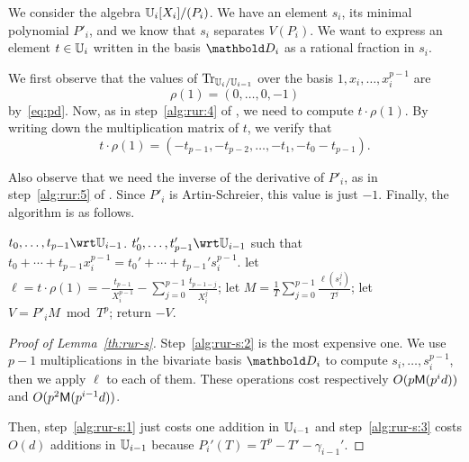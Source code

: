 We consider the algebra $\mathbb{U}_i[X_i]/(P_i)$. We have an element $s_i$,
its minimal polynomial $P'_i$, and we know that $s_i$ separates
$V(P_i)$. We want to express an element $t\in\mathbb{U}_i$ written in the
basis $\basis{D}_i$ as a rational fraction in $s_i$.

We first observe that the values of $\operatorname{Tr}_{\mathbb{U}_i/\mathbb{U}_{i-1}}$ over the
basis $1,x_i,\ldots,x_i^{p-1}$ are 
\begin{equation}
  \label{eq:110}
  \rho(1) = (0,\ldots,0,-1)
\end{equation}
by~\eqref{eq:pd}. Now, as in step~\ref{alg:rur:4} of
, we need to compute $t\cdot\rho(1)$. By
writing down the multiplication matrix of $t$, we verify that
\begin{equation}
  \label{eq:111}
  t\cdot\rho(1) = (-t_{p-1}, -t_{p-2}, \ldots, -t_1, -t_0-t_{p-1})
  \text{.}
\end{equation}

Also observe that we need the inverse of the derivative of $P'_i$, as
in step~\ref{alg:rur:5} of . Since $P'_i$ is Artin-Schreier,
this value is just $-1$. Finally, the algorithm
 is as follows.

\begin{algorithm}
  \caption{$_{\lst{s}_i}$}
  \label{alg:RUR-si}
  \begin{algorithmic}[1]
    \REQUIRE $t_0,\ldots,t_{p-1}\wrt\U_{i-1}$.
    \ENSURE $t_0',\ldots,t_{p-1}'\wrt\U_{i-1}$ such that $t_0+\cdots+t_{p-1}x_i^{p-1}=t_0'+\cdots+t_{p-1}'s_i^{p-1}$.
    \STATE \label{alg:rur-s:1}let $\ell = t\cdot\rho(1) =  -\frac{t_{p-1}}{X_i^{p-1}} - \sum_{j=0}^{p-1} \frac{t_{p-1-j}}{X_i^j}$;
    \STATE \label{alg:rur-s:2}let $M = \frac{1}{T}\sum_{j=0}^{p-1}\frac{\ell(s_i^j)}{T^j}$;
    \STATE \label{alg:rur-s:3}let $V = P'_iM \bmod T^p$;
    \STATE return $-V$.
  \end{algorithmic}
\end{algorithm}

\begin{proof}[Proof of Lemma~\ref{th:rur-s}]
  Step~\ref{alg:rur-s:2} is the most expensive one. We use $p-1$
  multiplications in the bivariate basis $\basis{D}_i$ to compute
  $s_i,\ldots,s_i^{p-1}$, then we apply $\ell$ to each of them. These
  operations cost respectively $O(p\mathsf{M}(p^id))$ and
  $O(p^2\mathsf{M}(p^{i-1}d))$.

  Then, step~\ref{alg:rur-s:1} just costs one addition in $\mathbb{U}_{i-1}$
  and step~\ref{alg:rur-s:3} costs $O(d)$ additions in $\mathbb{U}_{i-1}$
  because $P_i'(T)=T^p-T'-\gamma_{i-1}'$.
\end{proof}

